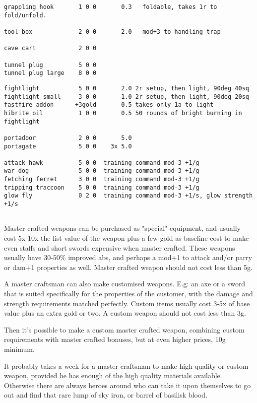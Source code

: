 \begin{verbatim}
grappling hook       1 0 0       0.3   foldable, takes 1r to fold/unfold.

tool box             2 0 0       2.0   mod+3 to handling trap

cave cart            2 0 0

tunnel plug          5 0 0
tunnel plug large    8 0 0

\end{verbatim} \goodbreak \begin{verbatim}
fightlight           5 0 0       2.0 2r setup, then light, 90deg 40sq
fightlight small     3 0 0       1.0 2r setup, then light, 90deg 20sq
fastfire addon      +3gold       0.5 takes only 1a to light
hibrite oil          1 0 0       0.5 50 rounds of bright burning in fightlight

portadoor            2 0 0       5.0
portagate            5 0 0    3x 5.0

attack hawk          5 0 0  training command mod-3 +1/g
war dog              5 0 0  training command mod-3 +1/g
fetching ferret      3 0 0  training command mod-3 +1/g
tripping traccoon    5 0 0  training command mod-3 +1/g
glow fly             0 2 0  training command mod-3 +1/s, glow strength +1/s


\end{verbatim}
\normalsize

Master crafted weapons can be purchased as "special" equipment, and usually cost 5x-10x the list value of the weapon plus a few gold as baseline cost to make even staffs and short swords expensive when master crafted. These weapons usually have 30-50\% improved abs, and perhaps a mod+1 to attack and/or parry or dam+1 properties as well. Master crafted weapon should not cost less than 5g.

A master craftsman can also make customised weapons. E.g: an axe or a sword that is suited specifically for the properties of the customer, with the damage and strength requirements matched perfectly. Custom items usually cost 3-5x of base value plus an extra gold or two. A custom weapon should not cost less than 3g.

Then it's possible to make a custom master crafted weapon, combining custom requirements with master crafted bonuses, but at even higher prices, 10g minimum.

It probably takes a week for a master craftsman to make high quality or custom weapon, provided he has enough of the high quality materials available. Otherwise there are always heroes around who can take it upon themselves to go out and find that rare lump of sky iron, or barrel of basilisk blood.

